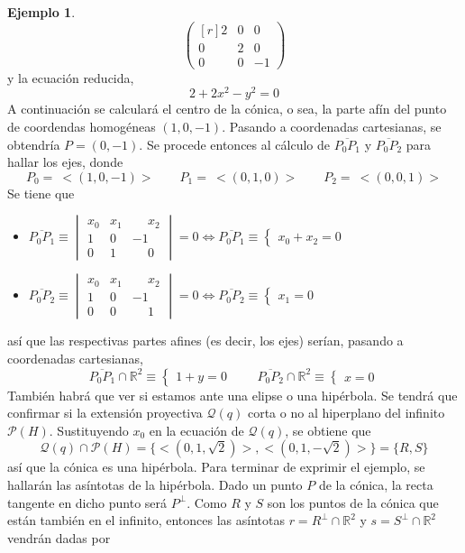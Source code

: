 \documentclass[12pt]{report}
\theoremstyle{definition}
\theoremstyle{definition}
\newtheorem{example}{Ejemplo}[chapter]
\theoremstyle{remark}
\newcommand{\R}{\mathbb R}
\begin{document}
\begin{example}
\[\begin{pmatrix*}[r]
    2 & 0 & 0 \\
    0 & 2 & 0 \\
    0 & 0 & -1
\end{pmatrix*}\]
y la ecuación reducida,
\[2+2x^2-y^2 = 0\]
A continuación se calculará el centro de la cónica, o sea, la parte afín del punto de coordendas homogéneas $(1,0,-1)$. Pasando a coordenadas cartesianas, se obtendría $P = (0,-1)$. Se procede entonces al cálculo de $\overline{P_0P_1}$ y $\overline{P_0P_2}$ para hallar los ejes, donde \[P_0 = \ <(1,0,-1)> \qquad P_1 = \ <(0,1,0)> \qquad P_2 = \ <(0,0,1)>\]
Se tiene que
\begin{itemize}
    \item $\displaystyle \overline{P_0P_1} \equiv \begin{vmatrix}
        x_0 & x_1 & \phantom{-}x_2 \\
        1 & 0 & -1 \\
        0 & 1 & \phantom{-}0
    \end{vmatrix} = 0 \iff \overline{P_0P_1} \equiv \begin{cases}
        x_0+x_2 = 0
    \end{cases}$
    \item $\displaystyle \overline{P_0P_2} \equiv \begin{vmatrix}
        x_0 & x_1 & \phantom{-}x_2 \\
        1 & 0 & -1 \\
        0 & 0 & \phantom{-}1
    \end{vmatrix} = 0 \iff \overline{P_0P_2} \equiv \begin{cases}
        x_1 = 0
    \end{cases}$
\end{itemize}
así que las respectivas partes afines (es decir, los ejes) serían, pasando a coordenadas cartesianas,
\[\overline{P_0P_1} \cap \R^2 \equiv \begin{cases}
    1 + y = 0
\end{cases}\qquad \overline{P_0P_2} \cap \R^2 \equiv \begin{cases}
    x = 0
\end{cases}\]
También habrá que ver si estamos ante una elipse o una hipérbola. Se tendrá que confirmar si la extensión proyectiva $\mathcal{Q}(q)$ corta o no al hiperplano del infinito $\mathcal{P}(H)$. Sustituyendo $x_0$ en la ecuación de $\mathcal{Q}(q)$, se obtiene que
\[\mathcal{Q}(q) \cap \mathcal{P}(H) = \{<(0,1,\sqrt{2})>,<(0,1,-\sqrt{2})>\} = \{R, S\}\]
así que la cónica es una hipérbola. Para terminar de exprimir el ejemplo, se hallarán las asíntotas de la hipérbola. Dado un punto $P$ de la cónica, la recta tangente en dicho punto será $P^\perp$. Como $R$ y $S$ son los puntos de la cónica que están también en el infinito, entonces las asíntotas $r = R^\perp \cap \R^2$ y $s = S^\perp \cap \R^2$ vendrán dadas por


\end{example}
\end{document}
